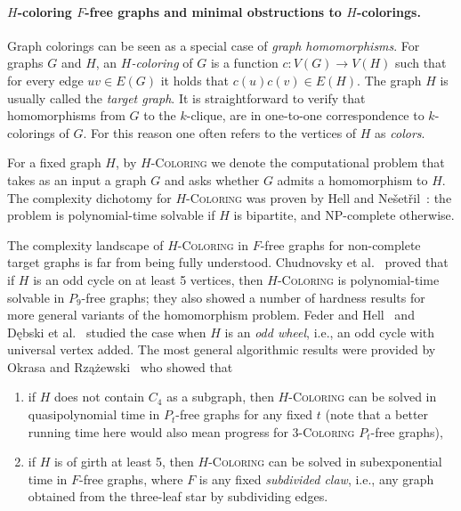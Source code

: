 \documentclass[11pt,a4paper]{article}
\theoremstyle{mystyle}
\newcommand{\colo}[1]{\ensuremath{#1}-\textsc{Coloring}\xspace}
\newcommand{\NP}{\textsf{NP}}
\begin{document}
\paragraph{$H$-coloring $F$-free graphs and minimal obstructions to $H$-colorings.} Graph colorings can be seen as a special case of \emph{graph homomorphisms}.
For graphs $G$ and $H$, an \emph{$H$-coloring} of $G$ is a function $c: V(G) \to V(H)$ such that for every edge $uv \in E(G)$ it holds that $c(u)c(v) \in E(H)$. The graph $H$ is usually called the \emph{target graph}.
It is straightforward to verify that homomorphisms from $G$ to the $k$-clique, are in one-to-one correspondence to $k$-colorings of $G$. For this reason one often refers to the vertices of $H$ as \emph{colors}.

For a fixed graph $H$, by \colo{H} we denote the computational problem that takes as an input a graph $G$ and asks whether $G$ admits a homomorphism to $H$. The complexity dichotomy for \colo{H} was proven by Hell and Ne\v{s}et\v{r}il~\cite{DBLP:journals/jct/HellN90}: the problem is polynomial-time solvable if $H$ is bipartite, and \NP-complete otherwise.

The complexity landscape of \colo{H} in $F$-free graphs for non-complete target graphs is far from being fully understood.
Chudnovsky et al.~\cite{DBLP:journals/iandc/ChudnovskyHRSZ23} proved that if $H$ is an odd cycle on at least 5 vertices, then \colo{H} is polynomial-time solvable in $P_9$-free graphs; they also showed a number of hardness results for more general variants of the homomorphism problem.
Feder and Hell~\cite{edgelists} and D\k{e}bski et al.~\cite{debski_et_al:LIPIcs.ISAAC.2022.14} studied the case when $H$ is an \emph{odd wheel}, i.e., an odd cycle with universal vertex added.
The most general algorithmic results were provided by Okrasa and Rzążewski~\cite{DBLP:conf/stacs/OkrasaR21} who showed that 
\begin{enumerate}[(OR1)]
    \item if $H$ does not contain $C_4$ as a subgraph, then \colo{H} can be solved in quasipolynomial time in $P_t$-free graphs for any fixed $t$ (note that a better running time here would also mean progress for  \colo{3} $P_t$-free graphs),
    \item if $H$ is of girth at least 5, then \colo{H} can be solved in subexponential time in $F$-free graphs, where $F$ is any fixed \emph{subdivided claw}, i.e., any graph obtained from the three-leaf star by subdividing edges.
\end{enumerate}
\end{document}

